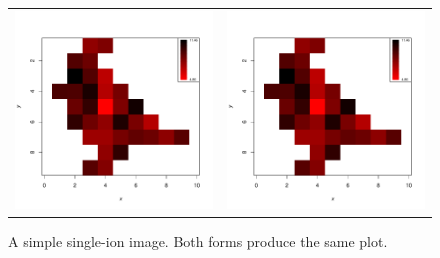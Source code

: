 \documentclass[a4paper]{article}
\begin{document}
\begin{figure}
\begin{center}
\begin{tabular}{cc}
\includegraphics{Cardinal-demo-029}
&
\includegraphics{Cardinal-demo-030}
\end{tabular}
\caption{\small A simple single-ion image. Both forms produce the same plot.}
\end{center}
\end{figure}
\end{document}
